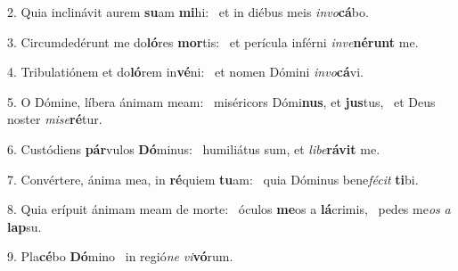 2. Quia inclinávit aurem \textbf{su}am \textbf{mi}hi: \ast\  et in diébus meis \textit{in}\textit{vo}\textbf{cá}bo.\

3. Circumdedérunt me do\textbf{ló}res \textbf{mor}tis: \ast\  et perícula inférni \textit{in}\textit{ve}\textbf{né}\textbf{runt} me.\

4. Tribulatiónem et do\textbf{ló}rem in\textbf{vé}ni: \ast\  et nomen Dómini \textit{in}\textit{vo}\textbf{cá}vi.\

5. O Dómine, líbera ánimam meam: \dag\  miséricors Dómi\textbf{nus}, et \textbf{jus}tus, \ast\  et Deus noster \textit{mi}\textit{se}\textbf{ré}tur.\

6. Custódiens \textbf{pár}vulos \textbf{Dó}minus: \ast\  humiliátus sum, et \textit{li}\textit{be}\textbf{rá}\textbf{vit} me.\

7. Convértere, ánima mea, in \textbf{ré}quiem \textbf{tu}am: \ast\  quia Dóminus bene\textit{fé}\textit{cit} \textbf{ti}bi.\

8. Quia erípuit ánimam meam de morte: \dag\  óculos \textbf{me}os a \textbf{lá}crimis, \ast\  pedes me\textit{os} \textit{a} \textbf{lap}su.\

9. Pla\textbf{cé}bo \textbf{Dó}mino \ast\  in regió\textit{ne} \textit{vi}\textbf{vó}rum.\

